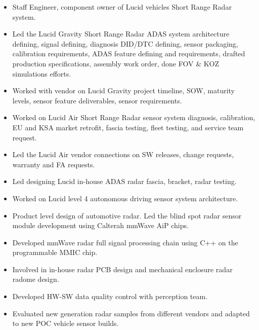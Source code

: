 \documentclass[10pt,letter,ragged2e,withhyper]{leozhang}
\begin{document}
\begin{itemize}
  \item Staff Engineer, component owner of Lucid vehicles Short Range Radar system.
  \item Led the Lucid Gravity Short Range Radar ADAS system architecture defining, signal defining, diagnosis DID/DTC defining, sensor packaging, calibration requirements, ADAS feature defining and requirements, drafted production specifications, assembly work order, done FOV \& KOZ simulations efforts.
  \item Worked with vendor on Lucid Gravity project timeline, SOW, maturity levels, sensor feature deliverables, sensor requirements.
  \item Worked on Lucid Air Short Range Radar sensor system diagnosis, calibration, EU and KSA market retrofit, fascia testing, fleet testing, and service team request.
  \item Led the Lucid Air vendor connections on SW releases, change requests, warranty and FA requests.
  \item Led designing Lucid in-house ADAS radar fascia, bracket, radar testing.
  \item Worked on Lucid level 4 autonomous driving sensor system architecture.
\end{itemize}

\divider

\begin{itemize}
  \item Product level design of automotive radar. Led the blind spot radar sensor module development using Calterah mmWave AiP chips. 
  \item Developed mmWave radar full signal processing chain using C++ on the programmable MMIC chip.
  \item Involved in in-house radar PCB design and mechanical enclosure radar radome design.
  \item Developed HW-SW data quality control with perception team.
  \item Evaluated new generation radar samples from different vendors and adapted to new POC vehicle sensor builds.
\end{itemize}
\end{document}
